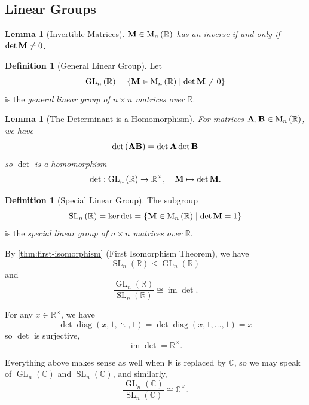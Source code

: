 \documentclass{article}
\newtheorem{lemma}[theorem]{Lemma}
\theoremstyle{definition}
\newtheorem{definition}[theorem]{Definition}
\theoremstyle{remark}
\newcommand{\pqty}[1]{\left(#1\right)}
\newcommand{\set}[2]{\{#1\mid #2\}}
\newcommand{\flatfrac}[2]{\frac{#1}{#2}}
\newcommand{\function}[5]{#1:#2\to #3,\quad #4\mapsto #5}
\newcommand{\multiplicative}{^{\times}}
\newcommand{\isomorphic}{\cong}
\newcommand{\normalsub}{\trianglelefteq}
\newcommand{\RR}{\mathbb{R}}
\newcommand{\CC}{\mathbb{C}}
\newcommand{\GL}{\operatorname{GL}}
\newcommand{\SL}{\operatorname{SL}}
\newcommand{\diag}{\operatorname{diag}}
\newcommand{\img}{\operatorname{im}}
\newcommand{\matrixset}{\mathrm{M}}
\begin{document}
\subsection{Linear Groups}
\label{sec:linear-groups}

\begin{lemma}[Invertible Matrices]
    \label{lem:invertible-matrices}%
    \(\vb{M} \in \matrixset_n\pqty{\RR}\) has an inverse if and only if \(\det \vb{M} \neq 0\).
\end{lemma}

\begin{definition}[General Linear Group]
    \label{def:general-linear}%
    Let
    \[
        \GL_n\pqty{\RR} = \set{\vb{M} \in \matrixset_n \pqty{\RR}}{\det \vb{M} \neq 0}
    \]
    is the \emph{general linear group of \(n \times n\) matrices over \(\RR\)}.
\end{definition}

\begin{lemma}[The Determinant is a Homomorphism]
    \label{lem:determinant}%
    For matrices \(\vb{A}, \vb{B} \in \matrixset_n\pqty{\RR}\), we have
    \[
        \det\pqty{\vb{A}\vb{B}} = \det\vb{A} \det\vb{B}
    \]
    so \(\det\) is a homomorphism
    \[
        \function{\det}{\GL_n\pqty{\RR}}{\RR\multiplicative}{\vb{M}}{\det\vb{M}}.
    \]
\end{lemma}

\begin{definition}[Special Linear Group]
    \label{def:special-linear}%
    The subgroup
    \[
        \SL_n\pqty{\RR} = \ker \det = \set{\vb{M} \in \matrixset_n \pqty{\RR}}{\det \vb{M} = 1}
    \]
    is the \emph{special linear group of \(n \times n\) matrices over \(\RR\)}.
\end{definition}

By \autoref{thm:first-isomorphism} (First Isomorphism Theorem), we have
\[
    \SL_n\pqty{\RR} \normalsub \GL_n\pqty{\RR}
\]
and
\[
    \flatfrac{\GL_n\pqty{\RR}}{\SL_n\pqty{\RR}} \isomorphic \img\det.
\]

For any \(x \in \RR\multiplicative\), we have
\[
    \det \operatorname{diag}\pqty{x, 1, \ddots, 1} = \det\diag\pqty{x, 1, \ldots, 1} = x
\]
so \(\det\) is surjective,
\[
    \img\det = \RR\multiplicative.
\]

Everything above makes sense as well when \(\RR\) is replaced by \(\CC\), so we may speak of \(\GL_n\pqty{\CC}\) and \(\SL_n\pqty{\CC}\), and similarly,
\[
    \flatfrac{\GL_n\pqty{\CC}}{\SL_n\pqty{\CC}} \isomorphic \CC\multiplicative.
\]
\end{document}
